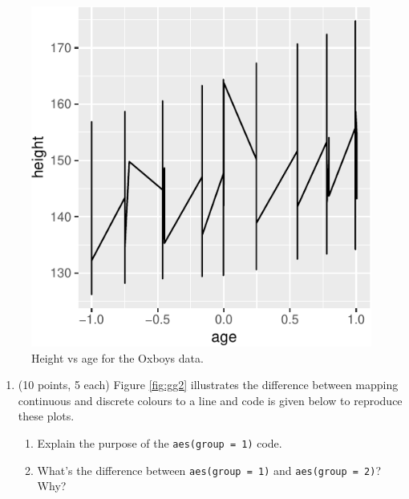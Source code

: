 \documentclass[letterpaper,12pt,twoside,]{pinp}
\providecommand{\tightlist}{%
  \setlength{\itemsep}{0pt}\setlength{\parskip}{0pt}}
\begin{document}
\begin{figure}[H]

{\centering \includegraphics{a3-data-summary_files/figure-latex/ggplot-1} 

}

\caption{Height vs age for the Oxboys data.}\label{fig:ggplot}
\end{figure}

\begin{enumerate}
\def\labelenumi{\alph{enumi})}
\setcounter{enumi}{4}
\tightlist
\item
  (10 points, 5 each) Figure \ref{fig:gg2} illustrates the difference
  between mapping continuous and discrete colours to a line and code is
  given below to reproduce these plots.

  \begin{enumerate}
  \def\labelenumii{\roman{enumii})}
  \tightlist
  \item
    Explain the purpose of the \texttt{aes(group\ =\ 1)} code.\\
  \item
    What's the difference between \texttt{aes(group\ =\ 1)} and
    \texttt{aes(group\ =\ 2)}? Why?
  \end{enumerate}
\end{enumerate}
\end{document}
